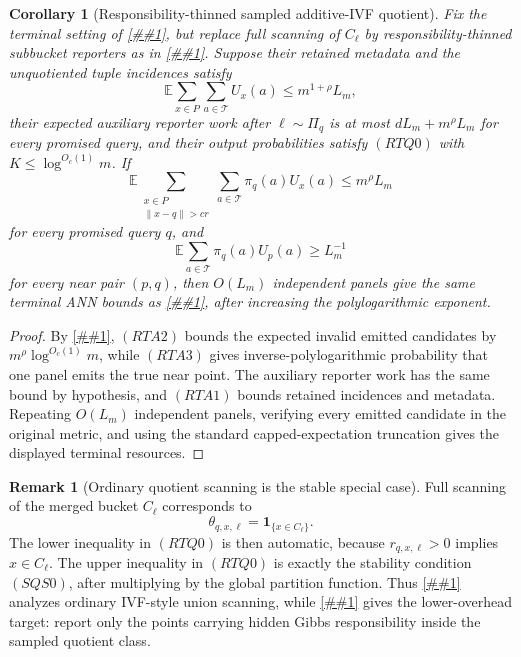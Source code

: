 \documentclass[10pt]{article}
\newcommand{\cref}[1]{\ref{##1}}
\newtheorem{corollary}[theorem]{Corollary}
\theoremstyle{definition}
\newtheorem{remark}[theorem]{Remark}
\newcommand{\E}{\mathbb{E}}
\begin{document}
\begin{corollary}[Responsibility-thinned sampled additive-IVF quotient]
   \label{cor:responsibility-thinned-sampled-aq}
   Fix the terminal setting of \cref{cor:finite-state-sampled-aq}, but replace
   full scanning of \(C_\ell\) by responsibility-thinned subbucket reporters as
   in \cref{lem:responsibility-thinned-quotient}.  Suppose their retained
   metadata and the unquotiented tuple incidences satisfy
   \[
      \E\sum_{x\in P}\sum_{a\in\mathcal T}U_x(a)
      \le m^{1+\rho}L_m,
      \tag{RTA1}
   \]
   their expected auxiliary reporter work after \(\ell\sim\Pi_q\) is at most
   \(dL_m+m^\rho L_m\) for every promised query, and their output
   probabilities satisfy \((RTQ0)\) with \(K\le\log^{O_c(1)}m\).  If
   \[
      \E
      \sum_{\substack{x\in P\\ \|x-q\|>cr}}
      \sum_{a\in\mathcal T}\pi_q(a)U_x(a)
      \le m^\rho L_m
      \tag{RTA2}
   \]
   for every promised query \(q\), and
   \[
      \E\sum_{a\in\mathcal T}\pi_q(a)U_p(a)
      \ge L_m^{-1}
      \tag{RTA3}
   \]
   for every near pair \((p,q)\), then \(O(L_m)\) independent panels give the
   same terminal ANN bounds as \cref{cor:finite-state-sampled-aq}, after
   increasing the polylogarithmic exponent.
\end{corollary}

\begin{proof}
   By \cref{lem:responsibility-thinned-quotient}, \((RTA2)\) bounds the
   expected invalid emitted candidates by \(m^\rho\log^{O_c(1)}m\), while
   \((RTA3)\) gives inverse-polylogarithmic probability that one panel emits
   the true near point.  The auxiliary reporter work has the same bound by
   hypothesis, and \((RTA1)\) bounds retained incidences and metadata.  Repeating
   \(O(L_m)\) independent panels, verifying every emitted candidate in the
   original metric, and using the standard capped-expectation truncation gives
   the displayed terminal resources.
\end{proof}

\begin{remark}[Ordinary quotient scanning is the stable special case]
   \label{rem:ordinary-quotient-scanning-stability}
   Full scanning of the merged bucket \(C_\ell\) corresponds to
   \[
      \theta_{q,x,\ell}=\mathbf 1_{\{x\in C_\ell\}}.
   \]
   The lower inequality in \((RTQ0)\) is then automatic, because
   \(r_{q,x,\ell}>0\) implies \(x\in C_\ell\).  The upper inequality in
   \((RTQ0)\) is exactly the stability condition \((SQS0)\), after multiplying
   by the global partition function.  Thus
   \cref{lem:stable-quotient-sampled-spectrum} analyzes ordinary IVF-style
   union scanning, while \cref{lem:responsibility-thinned-quotient} gives the
   lower-overhead target: report only the points carrying hidden Gibbs
   responsibility inside the sampled quotient class.
\end{remark}
\end{document}
